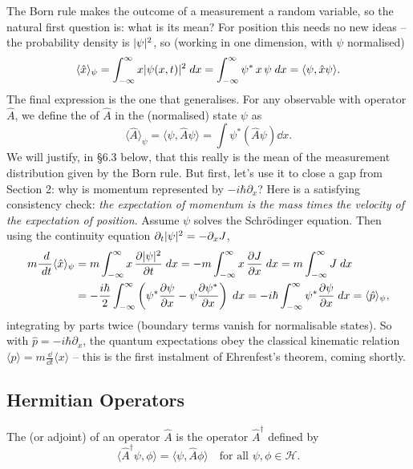 \documentclass[a4paper]{scrartcl}
\newcommand{\inp}[2]{\langle #1, #2 \rangle}
\begin{document}
The Born rule makes the outcome of a measurement a random variable, so the natural first question is: what is its mean? For position this needs no new ideas -- the probability density is $\lvert\psi\rvert^2$, so (working in one dimension, with $\psi$ normalised)
$$
\langle \hat{x} \rangle_\psi = \int_{-\infty}^{\infty} x \abs{\psi(x, t)}^2 \dd x = \int_{-\infty}^{\infty} \psi^* \, x \, \psi \dd x = \inp{\psi}{\hat{x} \psi}.
$$
The final expression is the one that generalises. For any observable with operator $\hat{A}$, we define the  of $\hat A$ in the (normalised) state $\psi$ as
$$
\langle \hat{A} \rangle_\psi = \inp{\psi}{\hat{A} \psi} = \int \psi^* (\hat{A} \psi) \dd x.
$$
We will justify, in \S 6.3 below, that this really is the mean of the measurement distribution given by the Born rule. But first, let's use it to close a gap from Section 2: why is momentum represented by $-i\hbar \partial_x$? Here is a satisfying consistency check: \emph{the expectation of momentum is the mass times the velocity of the expectation of position}. Assume $\psi$ solves the Schr\"odinger equation. Then using the continuity equation $\partial_t \lvert\psi\rvert^2 = -\partial_x J$,
\begin{align*}
    m \frac{\; d}{\; d t} \langle \hat x \rangle_\psi
    &= m \int_{-\infty}^{\infty} x \, \frac{\partial \lvert\psi\rvert^2}{\partial t} \; d x
    = -m \int_{-\infty}^{\infty} x \, \frac{\partial J}{\partial x} \; d x
    = m \int_{-\infty}^{\infty} J \; d x \\
    &= -\frac{i \hbar}{2} \int_{-\infty}^{\infty} \left( \psi^* \frac{\partial \psi}{\partial x} - \psi \frac{\partial \psi^*}{\partial x} \right) \; d x
    = -i\hbar \int_{-\infty}^{\infty} \psi^* \frac{\partial \psi}{\partial x} \; d x = \langle \hat{p} \rangle_\psi,
\end{align*}
integrating by parts twice (boundary terms vanish for normalisable states). So with $\hat{p} = -i\hbar\partial_x$, the quantum expectations obey the classical kinematic relation $\langle p \rangle = m \frac{\dd}{\dd t}\langle x \rangle$ -- this is the first instalment of Ehrenfest's theorem, coming shortly.

\subsection{Hermitian Operators}

\begin{definition}
    The  (or adjoint) of an operator $\hat{A}$ is the operator $\hat{A}^\dagger$ defined by
    $$
    \inp{\hat{A}^\dagger \psi}{\phi} = \inp{\psi}{\hat{A} \phi} \quad \text{for all } \psi, \phi \in \mathcal{H}.
    $$
\end{definition}
\end{document}
